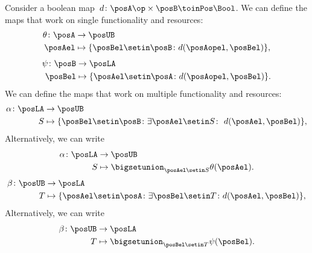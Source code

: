 Consider a boolean map~$d\colon \posA\op \times \posB \toinPos \Bool$.
We can define the maps that work on single functionality and resources:
%
\begin{equation}
    \begin{aligned}
        \theta\colon \posA & \to \posUB \\
        \posAel            & \mapsto \{\posBel\setin \posB \colon d(\posAopel, \posBel) \},
    \end{aligned}
\end{equation}
%
\begin{equation}
    \begin{aligned}
        \psi\colon \posB & \to \posLA \\
        \posBel          & \mapsto \{\posAel\setin \posA \colon d(\posAopel, \posBel) \}.
    \end{aligned}
\end{equation}
We can define the maps that work on multiple functionality and resources:
\begin{equation}
    \label{eq:galoisalfa}
    \begin{aligned}
        \alpha\colon \posLA & \to \posUB \\
        S                   & \mapsto \{\posBel\setin \posB \colon \exists \posAel\setin S\colon \ d(\posAel,\posBel)\},
    \end{aligned}
\end{equation}
Alternatively, we can write
\begin{equation}
    \begin{aligned}
        \alpha \colon \posLA & \to \posUB \\
        S                    & \mapsto \bigsetunion_{\posAel\setin S} \theta(\posAel).
    \end{aligned}
\end{equation}
%
\begin{equation}
    \label{eq:galoisbeta}
    \begin{aligned}
        \beta\colon \posUB & \to \posLA \\
        T                  & \mapsto \{\posAel\setin \posA  \colon \exists \posBel\setin T\colon d(\posAel,\posBel)\},
    \end{aligned}
\end{equation}
%
\noindent Alternatively, we can write
\begin{equation}
    \begin{aligned}
        \beta \colon \posUB & \to \posLA \\
        T                   & \mapsto \bigsetunion_{\posBel\setin T} \psi(\posBel).
    \end{aligned}
\end{equation}
